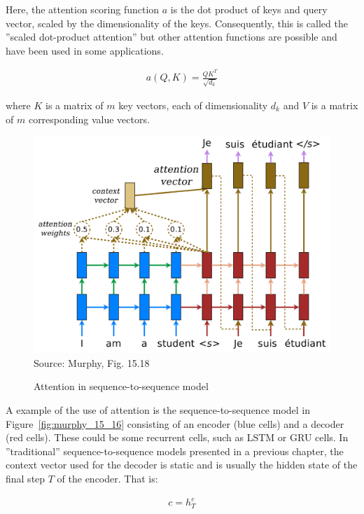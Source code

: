 Here, the attention scoring function $a$ is the dot product of keys and query vector, scaled by the dimensionality of the keys. Consequently, this is called the ''scaled dot-product attention'' but other attention functions are possible and have been used in some applications. 

\begin{align*}
a(Q, K) = \frac{Q K^T}{\sqrt{d_k}}
\end{align*}

where $K$ is a matrix of $m$ key vectors, each of dimensionality $d_k$ and $V$ is a matrix of $m$ corresponding value vectors. 

\begin{figure}
\centering

\includegraphics[width=.8\textwidth]{murphy_15_18.png} \\

\scriptsize Source: Murphy, Fig. 15.18 \normalsize
\caption{Attention in sequence-to-sequence model}
\label{fig:murphy_15_18}
\end{figure}

A example of the use of attention is the sequence-to-sequence model in Figure~\ref{fig:murphy_15_16} consisting of an encoder (blue cells) and a decoder (red cells). These could be some recurrent cells, such as LSTM or GRU cells. In ''traditional'' sequence-to-sequence models presented in a previous chapter, the context vector used for the decoder is static and is usually the hidden state of the final step $T$ of the encoder. That is:

\begin{align*}
c = h^e_T
\end{align*}

